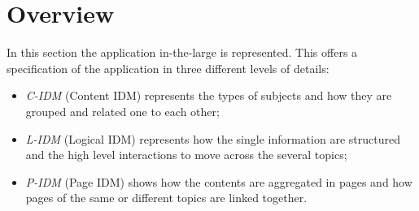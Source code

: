 \documentclass[../../DD.tex]{subfiles}
\begin{document}
\section{Overview \label{sect:2.1}}
	In this section the application in-the-large is represented. This offers a specification of the application in three different levels of details: 
	\begin{itemize}
		\item \textit{C-IDM} (Content IDM) represents the types of subjects and how they are grouped and related one to each other; 
		\item \textit{L-IDM} (Logical IDM) represents how the single information are structured and the high level interactions to move across the several topics;
		\item \textit{P-IDM} (Page IDM) shows how the contents are aggregated in pages and how pages of the same or different topics are linked together.
	\end{itemize}
\end{document}
